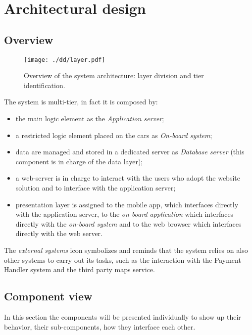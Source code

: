 \documentclass{scrreprt}
\begin{document}
\begin{comment}
\section{Document structure}
\end{comment}

\chapter{Architectural design}

\section{Overview}
\begin{figure}[h]
\centering
		\texttt{[image: ./dd/layer.pdf]}
		\caption{Overview of the system architecture: layer division and tier identification.}
		\label{layerTier}
\end{figure}
The system is multi-tier, in fact it is composed by:
\begin{itemize}
\item the main logic element as the \emph{Application server};
\item a restricted logic element placed on the cars as \emph{On-board system};
\item data are managed and stored in a dedicated server as \emph{Database server} (this component is in charge of the data layer);
\item a web-server is in charge to interact with the users who adopt the website solution and to interface with the application server;
\item presentation layer is assigned to the mobile app, which interfaces directly with the application server, to the \emph{on-board application} which interfaces directly with the \emph{on-board system} and to the web browser which interfaces directly with the web server.
\end{itemize}
The \emph{external systems} icon symbolizes and reminds that the system relies on also other systems to carry out its tasks, such as the interaction with the Payment Handler system and the third party maps service.

\section{Component view}
In this section the components will be presented individually to show up their behavior, their sub-components, how they interface each other.
\end{document}
